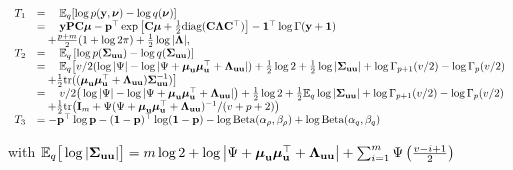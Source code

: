\documentclass{article}[12pt]
\begin{document}
$$
\begin{array}{rl}
T_1 &= \quad {\mathbb E}_q[\log{p({\bf y}, {\boldsymbol\nu})} - \log{q({\boldsymbol\nu})}] \\
&= \quad {\bf y} {\bf P} {\bf C} {\boldsymbol\mu} - {\bf p}^\top \exp{\left[ {\bf C}{\boldsymbol\mu}+ {\frac{1}{2}}\text{diag} ({\bf C}{\boldsymbol\Lambda}{\bf C}^\top) \right]} - {\bf 1}^\top\log \Gamma{({\bf y}+ {\bf1})}\\
& \quad + \frac{p + m}{2} (1 + \log{2 \pi}) + {\frac{1}{2}} \log{|{\boldsymbol\Lambda}|}, \\
T_2 &= \quad {\mathbb E}_q \left[ \log p({\boldsymbol \Sigma}_{{\bf u} {\bf u}}) - \log q({\boldsymbol \Sigma}_{{\bf u} {\bf u}}) \right] \\
&= \quad {\mathbb E}_q \big[ v/2(\log |\Psi| - \log |\Psi + {\boldsymbol \mu}_{\bf u} {\boldsymbol \mu}_{\bf u}^\top + {\boldsymbol \Lambda}_{{\bf u} {\bf u}}|) + {\frac{1}{2}} \log 2 + {\frac{1}{2}} \log|{\boldsymbol \Sigma}_{{\bf u} {\bf u}}| + \log \Gamma_{p+1}(v/2) - \log \Gamma_{p}(v/2)\\
&\quad + {\frac{1}{2}} \text{tr}(({\boldsymbol \mu}_{{\bf u}} {\boldsymbol \mu}_{{\bf u}}^\top + {\boldsymbol \Lambda}_{{\bf u} {\bf u}}) {\boldsymbol \Sigma}_{{\bf u} {\bf u}}^{-1}) \big] \\
&= \quad v/2\big(\log |\Psi| - \log |\Psi + {\boldsymbol \mu}_{\bf u} {\boldsymbol \mu}_{\bf u}^\top + {\boldsymbol \Lambda}_{{\bf u} {\bf u}}|\big) + {\frac{1}{2}} \log 2 + {\frac{1}{2}} {\mathbb E}_q \log |{\boldsymbol \Sigma}_{{\bf u} {\bf u}}| + \log \Gamma_{p+1}(v/2) - \log \Gamma_{p}(v/2) \\
&\quad + {\frac{1}{2}} \text{tr}\big({\bf I}_m + \Psi(\Psi+ {\boldsymbol \mu}_{\bf u} {\boldsymbol \mu}_{\bf u}^\top + {\boldsymbol \Lambda}_{{\bf u} {\bf u}})^{-1}/(v + p + 2)\big) \\
T_3 &= - {\bf p}^\top \log {\bf p} - ({\bf 1} - {\bf p})^\top \log ({\bf 1} - {\bf p}) - \log \text{Beta} (\alpha_\rho, \beta_\rho) + \log \text{Beta} (\alpha_q, \beta_q)
\end{array}
$$

with ${\mathbb E}_q \big[ \log |{\boldsymbol \Sigma}_{{\bf u} {\bf u}}| \big] = m \log 2 + \log \left | \Psi + {\boldsymbol \mu}_{\bf u} {\boldsymbol \mu}_{\bf u}^\top + {\boldsymbol \Lambda}_{{\bf u} {\bf u}} \right | + \sum_{i=1}^m \Psi \left ( \frac{v - i + 1}{2} \right )$



\end{document}
